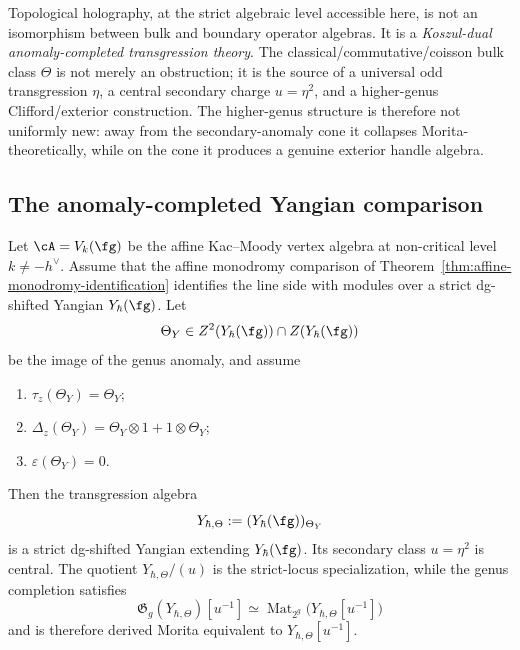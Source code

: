 Topological holography, at the strict algebraic level accessible here, is not an isomorphism between bulk and boundary operator algebras.
It is a \emph{Koszul-dual anomaly-completed transgression theory}.
The classical/commutative/coisson bulk class \(\Theta\) is not merely an obstruction; it is the source of a universal odd transgression \(\eta\), a central secondary charge \(u=\eta^{2}\), and a higher-genus Clifford/exterior construction.
The higher-genus structure is therefore not uniformly new:
away from the secondary-anomaly cone it collapses Morita-theoretically,
while on the cone it produces a genuine exterior handle algebra.


\subsection{The anomaly-completed Yangian comparison}
\label{subsec:anomaly-completed-yangian-comparison}

\begin{theorem}
\label{thm:anomaly-completed-yangian}
Let $\cA = V_k(\fg)$ be the affine Kac--Moody vertex algebra at
non-critical level $k\neq -h^\vee$.  Assume that the affine
monodromy comparison of
Theorem~\ref{thm:affine-monodromy-identification}
identifies the line side with modules over a strict dg-shifted
Yangian \(Y_\hbar(\fg)\).  Let
\[
\Theta_Y\in Z^2(Y_\hbar(\fg))\cap Z(Y_\hbar(\fg))
\]
be the image of the genus anomaly, and assume
\begin{enumerate}[label=\textup{(\roman*)}]
\item \(\tau_z(\Theta_Y)=\Theta_Y\);
\item \(\Delta_z(\Theta_Y)=\Theta_Y\otimes 1+1\otimes \Theta_Y\);
\item \(\varepsilon(\Theta_Y)=0\).
\end{enumerate}
Then the transgression algebra
\[
Y_{\hbar,\Theta}:=(Y_\hbar(\fg))_{\Theta_Y}
\]
is a strict dg-shifted Yangian extending \(Y_\hbar(\fg)\).  Its
secondary class \(u=\eta^2\) is central.  The quotient
\(Y_{\hbar,\Theta}/(u)\) is the strict-locus specialization, while
the genus completion satisfies
\[
\mathfrak G_g(Y_{\hbar,\Theta})[u^{-1}]
\simeq
\operatorname{Mat}_{2^g}\bigl(Y_{\hbar,\Theta}[u^{-1}]\bigr)
\]
and is therefore derived Morita equivalent to
\(Y_{\hbar,\Theta}[u^{-1}]\).
\end{theorem}

